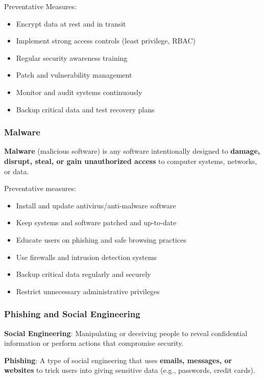 Preventative Measures:

\begin{itemize}
    \item Encrypt data at rest and in transit
    \item Implement strong access controls (least privilege, RBAC)
    \item Regular security awareness training
    \item Patch and vulnerability management
    \item Monitor and audit systems continuously
    \item Backup critical data and test recovery plans
\end{itemize}

\subsubsection{Malware}

\indent 

\textbf{Malware} (malicious software) is any software intentionally designed to \textbf{damage, disrupt, steal, or gain unauthorized access} to computer systems, networks, or data.

Preventative measures:

\begin{itemize}
    \item Install and update antivirus/anti-malware software
    \item Keep systems and software patched and up-to-date
    \item Educate users on phishing and safe browsing practices
    \item Use firewalls and intrusion detection systems
    \item Backup critical data regularly and securely
    \item Restrict unnecessary administrative privileges
\end{itemize}

\subsubsection{Phishing and Social Engineering}

\indent

\noindent\textbf{Social Engineering}: Manipulating or deceiving people to reveal confidential information or perform actions that compromise security.

\noindent\textbf{Phishing}: A type of social engineering that uses \textbf{emails, messages, or websites} to trick users into giving sensitive data (e.g., passwords, credit cards).

